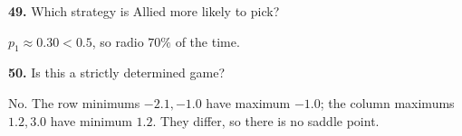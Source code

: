 \documentclass[12pt]{ximera}
\begin{document}
\begin{problem}
\begin{prompt}
\textbf{49.} Which strategy is Allied more likely to pick?
\begin{multipleChoice}
\end{multipleChoice}
\begin{feedback}
$p_1\approx0.30<0.5$, so radio $70\%$ of the time.
\end{feedback}
\end{prompt}

\begin{prompt}
\textbf{50.} Is this a strictly determined game?
\begin{multipleChoice}
\end{multipleChoice}
\begin{feedback}
No. The row minimums $-2.1,-1.0$ have maximum $-1.0$; the column maximums $1.2,3.0$ have minimum $1.2$. They differ, so there is no saddle point.
\end{feedback}
\end{prompt}
\end{problem}
\end{document}
